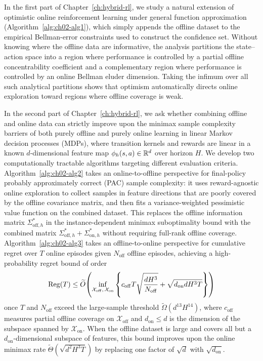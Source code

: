 \begin{aigenblock}
In the first part of Chapter~\ref{ch:hybrid-rl}, we study a natural extension of optimistic online reinforcement learning under general function approximation (Algorithm~\ref{alg:ch02-alg1}), which simply appends the offline dataset to the empirical Bellman-error constraints used to construct the confidence set. Without knowing where the offline data are informative, the analysis partitions the state--action space into a region where performance is controlled by a partial offline concentrability coefficient and a complementary region where performance is controlled by an online Bellman eluder dimension. Taking the infimum over all such analytical partitions shows that optimism automatically directs online exploration toward regions where offline coverage is weak.

In the second part of Chapter~\ref{ch:hybrid-rl}, we ask whether combining offline and online data can strictly improve upon the minimax sample complexity barriers of both purely offline and purely online learning in linear Markov decision processes (MDPs), where transition kernels and rewards are linear in a known $d$-dimensional feature map $\phi_h(s,a) \in {\mathbb{R}}^d$ over horizon $H$. We develop two computationally tractable algorithms targeting different evaluation criteria. Algorithm~\ref{alg:ch02-alg2} takes an online-to-offline perspective for final-policy probably approximately correct (PAC) sample complexity: it uses reward-agnostic online exploration to collect samples in feature directions that are poorly covered by the offline covariance matrix, and then fits a variance-weighted pessimistic value function on the combined dataset. This replaces the offline information matrix $\Sigma_{\mathrm{off},h}^*$ in the instance-dependent minimax suboptimality bound with the combined matrix $\Sigma_{\mathrm{off},h}^* + \Sigma_{\mathrm{on},h}^*$ without requiring full-rank offline coverage. Algorithm~\ref{alg:ch02-alg3} takes an offline-to-online perspective for cumulative regret over $T$ online episodes given $N_{\mathrm{off}}$ offline episodes, achieving a high-probability regret bound of order
\begin{equation}
\label{eq:intro-hybrid-regret}
\operatorname{Reg}(T) \le \widetilde{O}\!\left( \inf_{\mathcal{X}_{\mathrm{off}},\,\mathcal{X}_{\mathrm{on}}} \left\{ c_{\mathrm{off}} T \sqrt{\frac{d H^3}{N_{\mathrm{off}}}} + \sqrt{d_{\mathrm{on}} d H^3 T} \right\} \right)
\end{equation}
once $T$ and $N_{\mathrm{off}}$ exceed the large-sample threshold $\widetilde{\Omega}(d^{13} H^{14})$, where $c_{\mathrm{off}}$ measures partial offline coverage on $\mathcal{X}_{\mathrm{off}}$ and $d_{\mathrm{on}} \le d$ is the dimension of the subspace spanned by $\mathcal{X}_{\mathrm{on}}$. When the offline dataset is large and covers all but a $d_{\mathrm{on}}$-dimensional subspace of features, this bound improves upon the online minimax rate $\widetilde{\Theta}(\sqrt{d^2 H^3 T})$ by replacing one factor of $\sqrt{d}$ with $\sqrt{d_{\mathrm{on}}}$.


\end{aigenblock}
